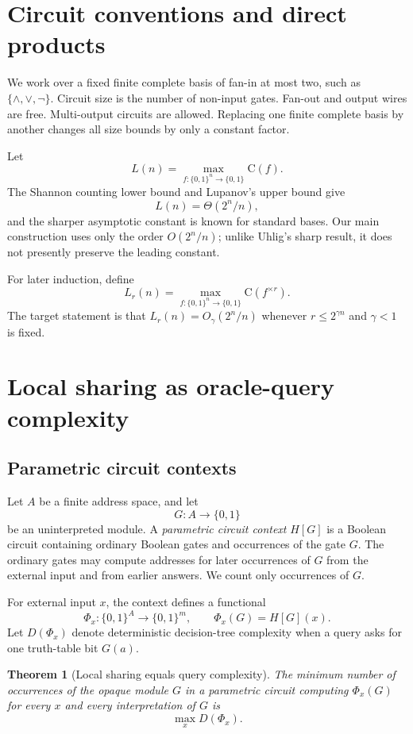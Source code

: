 \documentclass[11pt]{article}
\newtheorem{theorem}{Theorem}[section]
\theoremstyle{definition}
\newcommand{\bits}{\{0,1\}}
\newcommand{\C}{\mathrm{C}}
\begin{document}
\section{Circuit conventions and direct products}

We work over a fixed finite complete basis of fan-in at most two, such as
$\{\wedge,\vee,\neg\}$.  Circuit size is the number of non-input gates.  Fan-out and output wires are free.  Multi-output circuits are allowed.  Replacing one finite complete basis by another changes all size bounds by only a constant factor.

Let
\[
 L(n)=\max_{f:\bits^n\to\bits}\C(f).
\]
The Shannon counting lower bound and Lupanov's upper bound give
\[
 L(n)=\Theta(2^n/n),
\]
and the sharper asymptotic constant is known for standard bases.  Our main construction uses only the order $O(2^n/n)$; unlike Uhlig's sharp result, it does not presently preserve the leading constant.

For later induction, define
\[
 L_r(n)=\max_{f:\bits^n\to\bits}\C(f^{\times r}).
\]
The target statement is that $L_r(n)=O_\gamma(2^n/n)$ whenever
$r\le 2^{\gamma n}$ and $\gamma<1$ is fixed.

\section{Local sharing as oracle-query complexity}

\subsection{Parametric circuit contexts}

Let $A$ be a finite address space, and let
\[
 G:A\to\bits
\]
be an uninterpreted module.  A \emph{parametric circuit context} $H[G]$ is a Boolean circuit containing ordinary Boolean gates and occurrences of the gate $G$.  The ordinary gates may compute addresses for later occurrences of $G$ from the external input and from earlier answers.  We count only occurrences of $G$.

For external input $x$, the context defines a functional
\[
 \Phi_x:\bits^A\to\bits^m,
 \qquad
 \Phi_x(G)=H[G](x).
\]
Let $D(\Phi_x)$ denote deterministic decision-tree complexity when a query asks for one truth-table bit $G(a)$.

\begin{theorem}[Local sharing equals query complexity]\label{thm:oracle-query}
The minimum number of occurrences of the opaque module $G$ in a parametric circuit computing $\Phi_x(G)$ for every $x$ and every interpretation of $G$ is
\[
 \max_x D(\Phi_x).
\]
\end{theorem}
\end{document}
